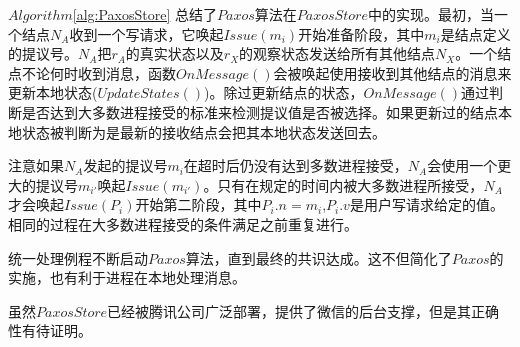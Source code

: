 	\par $Algorithm$\ref{alg:PaxosStore} 总结了$Paxos$算法在$PaxosStore$中的实现。最初，当一个结点$N_A$收到一个写请求，它唤起$Issue(m_i)$开始准备阶段，其中$m_i$是结点定义的提议号。$N_A$把$r_A$的真实状态以及$r_X$的观察状态发送给所有其他结点$N_X$。一个结点不论何时收到消息，函数$OnMessage()$会被唤起使用接收到其他结点的消息来更新本地状态($UpdateStates()$)。除过更新结点的状态，$OnMessage()$通过判断是否达到大多数进程接受的标准来检测提议值是否被选择。如果更新过的结点本地状态被判断为是最新的接收结点会把其本地状态发送回去。
	\par 注意如果$N_A$发起的提议号$m_i$在超时后仍没有达到多数进程接受，$N_A$会使用一个更大的提议号$m_{i'}$唤起$Issue(m_{i'})$。只有在规定的时间内被大多数进程所接受，$N_A$才会唤起$Issue(P_i)$开始第二阶段，其中$P_i.n=m_i$,$P_i.v$是用户写请求给定的值。相同的过程在大多数进程接受的条件满足之前重复进行。
	\par 统一处理例程不断启动$Paxos$算法，直到最终的共识达成。这不但简化了$Paxos$的实施，也有利于进程在本地处理消息。
	\par 虽然$PaxosStore$已经被腾讯公司广泛部署，提供了微信的后台支撑，但是其正确性有待证明。

